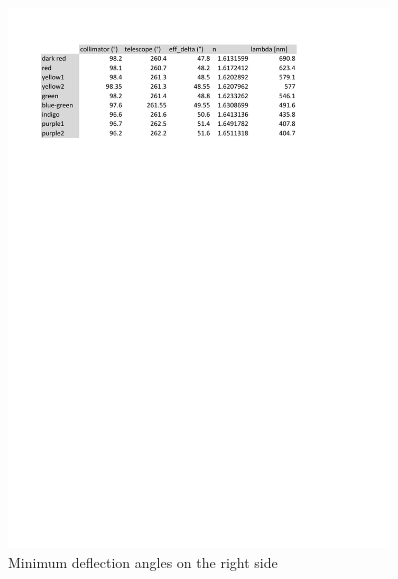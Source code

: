 \documentclass{scrreprt}
\begin{document}
\begin{figure}[H]
	\centering
  \includegraphics[width=0.9\textwidth]{diag/right.pdf}
	\caption{Minimum deflection angles on the right side}
	\label{fig:right}
\end{figure}
\end{document}
